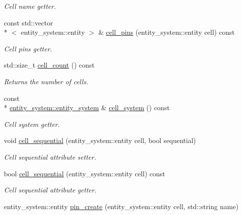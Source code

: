 \begin{DoxyCompactItemize}
\begin{DoxyCompactList}\small\item\em Cell name getter. \end{DoxyCompactList}\item 
const std\-::vector\\*
$<$ entity\-\_\-system\-::entity $>$ \& \hyperlink{classophidian_1_1standard__cell_1_1standard__cells_a8d048038d137045d091bac94d7c5f66c}{cell\-\_\-pins} (entity\-\_\-system\-::entity cell) const 
\begin{DoxyCompactList}\small\item\em Cell pins getter. \end{DoxyCompactList}\item 
std\-::size\-\_\-t \hyperlink{classophidian_1_1standard__cell_1_1standard__cells_a704442c2289df257ab5cd779f1307eef}{cell\-\_\-count} () const 
\begin{DoxyCompactList}\small\item\em Returns the number of cells. \end{DoxyCompactList}\item 
const \\*
\hyperlink{classophidian_1_1entity__system_1_1entity__system}{entity\-\_\-system\-::entity\-\_\-system} \& \hyperlink{classophidian_1_1standard__cell_1_1standard__cells_a252355a56e1275da8993337e1a329d33}{cell\-\_\-system} () const 
\begin{DoxyCompactList}\small\item\em Cell system getter. \end{DoxyCompactList}\item 
void \hyperlink{classophidian_1_1standard__cell_1_1standard__cells_addf513c86860b5c22524d6d8e1e997a6}{cell\-\_\-sequential} (entity\-\_\-system\-::entity cell, bool sequential)
\begin{DoxyCompactList}\small\item\em Cell sequential attribute setter. \end{DoxyCompactList}\item 
bool \hyperlink{classophidian_1_1standard__cell_1_1standard__cells_a7924494a06f6fc3087ddb9f6914c0840}{cell\-\_\-sequential} (entity\-\_\-system\-::entity cell) const 
\begin{DoxyCompactList}\small\item\em Cell sequential attribute getter. \end{DoxyCompactList}\item 
entity\-\_\-system\-::entity \hyperlink{classophidian_1_1standard__cell_1_1standard__cells_a8f293bfb46f9849fab0c2bb407e2032c}{pin\-\_\-create} (entity\-\_\-system\-::entity cell, std\-::string name)

\end{DoxyCompactItemize}
